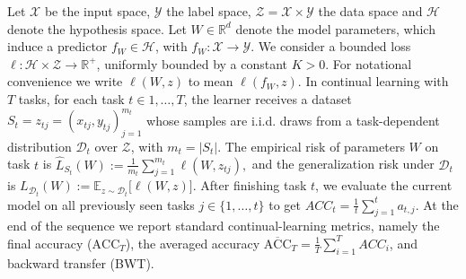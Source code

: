 \documentclass{article} %
\begin{document}
Let $\mathcal{X}$ be the input space, $\mathcal{Y}$ the label space, $\mathcal{Z} = \mathcal{X} \times \mathcal{Y}$ the data space and $\mathcal{H}$ denote the hypothesis space.
Let $W \in \mathbb{R}^d$ denote the model parameters, which induce a predictor
$f_W \in \mathcal{H}$, with $f_W : \mathcal{X} \to \mathcal{Y}$.
We consider a bounded loss $\ell : \mathcal{H} \times \mathcal{Z} \to \mathbb{R}^+$,
uniformly bounded by a constant $K>0$.
For notational convenience we write $\ell(W,z)$ to mean $\ell(f_W,z)$.
In continual learning with $T$ tasks, for each task $t\in{1,\ldots,T}$, the learner receives a dataset $S_t={z_{tj}=(x_{tj},y_{tj})}_{j=1}^{m_t}$  whose samples are i.i.d. draws from a task-dependent distribution $\mathcal{D}_t$ over $\mathcal{Z}$, with $m_t=|S_t|$.
The empirical risk of parameters $W$ on task $t$ is
$\hat{L}_{S_t}(W)
:= \frac{1}{m_t} \sum_{j=1}^{m_t} \ell(W, z_{tj}),
$
and the generalization risk under $\mathcal{D}_t$ is
$L_{\mathcal{D}_t}(W)
:= \mathbb{E}_{z \sim \mathcal{D}_t} \big[ \ell(W, z) \big].
$
After finishing task $t$, we evaluate the current model on all previously seen
tasks $j \in \{1,\ldots,t\}$ to get $ACC_t=\frac{1}{t}\sum_{j=1}^{t}a_{t,j}$. At the end of the sequence we report standard
continual-learning metrics, namely the final accuracy ($\text{ACC}_T$), the averaged accuracy $\overline{\text{ACC}}_T=\frac{1}{T} \sum_{i=1}^T A C C_i$, and backward transfer (BWT).






\end{document}
